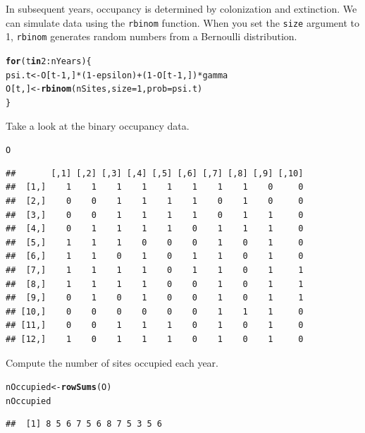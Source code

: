 \documentclass[12pt]{article}\usepackage[]{graphicx}\usepackage[]{xcolor}
\makeatletter
\newcommand{\hlnum}[1]{\textcolor[rgb]{0.686,0.059,0.569}{#1}}%
\newcommand{\hlopt}[1]{\textcolor[rgb]{0,0,0}{#1}}%
\newcommand{\hldef}[1]{\textcolor[rgb]{0.345,0.345,0.345}{#1}}%
\newcommand{\hlkwa}[1]{\textcolor[rgb]{0.161,0.373,0.58}{\textbf{#1}}}%
\newcommand{\hlkwb}[1]{\textcolor[rgb]{0.69,0.353,0.396}{#1}}%
\newcommand{\hlkwc}[1]{\textcolor[rgb]{0.333,0.667,0.333}{#1}}%
\newcommand{\hlkwd}[1]{\textcolor[rgb]{0.737,0.353,0.396}{\textbf{#1}}}%
\newenvironment{kframe}{%
 \def\at@end@of@kframe{}%
 \ifinner\ifhmode%
  \def\at@end@of@kframe{\end{minipage}}%
  \begin{minipage}{\columnwidth}%
 \fi\fi%
 \def\FrameCommand##1{\hskip\@totalleftmargin \hskip-\fboxsep
 \colorbox{shadecolor}{##1}\hskip-\fboxsep
     \hskip-\linewidth \hskip-\@totalleftmargin \hskip\columnwidth}%
 \MakeFramed {\advance\hsize-\width
   \@totalleftmargin\z@ \linewidth\hsize
   \@setminipage}}%
 {\par\unskip\endMakeFramed%
 \at@end@of@kframe}
\newenvironment{knitrout}{}{} %
\makeatother
\begin{document}
In subsequent years, occupancy is determined by colonization and
extinction. We can simulate data using the {\tt rbinom}
function. When you set the {\tt size} argument to 1, {\tt rbinom}
generates random numbers from a Bernoulli distribution.
\begin{knitrout}
\color{fgcolor}\begin{kframe}
\begin{alltt}
\hlkwa{for}\hldef{(t} \hlkwa{in} \hlnum{2}\hlopt{:}\hldef{nYears) \{}
    \hldef{psi.t} \hlkwb{<-} \hldef{O[t}\hlopt{-}\hlnum{1}\hldef{,]}\hlopt{*}\hldef{(}\hlnum{1}\hlopt{-}\hldef{epsilon)} \hlopt{+} \hldef{(}\hlnum{1}\hlopt{-}\hldef{O[t}\hlopt{-}\hlnum{1}\hldef{,])}\hlopt{*}\hldef{gamma}
    \hldef{O[t,]} \hlkwb{<-} \hlkwd{rbinom}\hldef{(nSites,} \hlkwc{size}\hldef{=}\hlnum{1}\hldef{,} \hlkwc{prob}\hldef{=psi.t)}
\hldef{\}}
\end{alltt}
\end{kframe}
\end{knitrout}

Take a look at the binary occupancy data.
\begin{knitrout}
\color{fgcolor}\begin{kframe}
\begin{alltt}
\hldef{O}
\end{alltt}
\begin{verbatim}
##       [,1] [,2] [,3] [,4] [,5] [,6] [,7] [,8] [,9] [,10]
##  [1,]    1    1    1    1    1    1    1    1    0     0
##  [2,]    0    0    1    1    1    1    0    1    0     0
##  [3,]    0    0    1    1    1    1    0    1    1     0
##  [4,]    0    1    1    1    1    0    1    1    1     0
##  [5,]    1    1    1    0    0    0    1    0    1     0
##  [6,]    1    1    0    1    0    1    1    0    1     0
##  [7,]    1    1    1    1    0    1    1    0    1     1
##  [8,]    1    1    1    1    0    0    1    0    1     1
##  [9,]    0    1    0    1    0    0    1    0    1     1
## [10,]    0    0    0    0    0    0    1    1    1     0
## [11,]    0    0    1    1    1    0    1    0    1     0
## [12,]    1    0    1    1    1    0    1    0    1     0
\end{verbatim}
\end{kframe}
\end{knitrout}

Compute the number of sites occupied each year.
\begin{knitrout}
\color{fgcolor}\begin{kframe}
\begin{alltt}
\hldef{nOccupied} \hlkwb{<-} \hlkwd{rowSums}\hldef{(O)}
\hldef{nOccupied}
\end{alltt}
\begin{verbatim}
##  [1] 8 5 6 7 5 6 8 7 5 3 5 6
\end{verbatim}
\end{kframe}
\end{knitrout}
\end{document}
